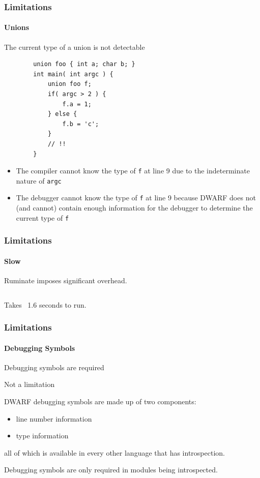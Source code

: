 \documentclass{beamer}
\begin{document}
\begin{frame}[fragile]
	\frametitle{Limitations}
	\framesubtitle{Unions}

	The current type of a union is not detectable

	\pause

	\begin{verbatim}
		union foo { int a; char b; }
		int main( int argc ) {
		    union foo f;
		    if( argc > 2 ) {
		        f.a = 1;
		    } else {
		        f.b = 'c';
		    }
		    // !!
		}
	\end{verbatim}

	\begin{itemize}
		\item The compiler cannot know the type of \lstinline|f| at line 9 due to the
			indeterminate nature of \lstinline|argc|
		\item The debugger cannot know the type of \lstinline|f| at line 9 because
			DWARF does not (and cannot) contain enough information for the debugger to
			determine the current type of \lstinline|f|
	\end{itemize}
\end{frame}

\begin{frame}
	\frametitle{Limitations}
	\framesubtitle{Slow}

	Ruminate imposes significant overhead.

	\inputminted[tabsize=4]{c}{ruminate_memory.c}

	Takes ~1.6 seconds to run.
\end{frame}

\begin{frame}
	\frametitle{Limitations}
	\framesubtitle{Debugging Symbols}

	Debugging symbols are required

	\pause

	Not a limitation

	\pause

	DWARF debugging symbols are made up of two components:
	\begin{itemize}
		\item line number information
		\item type information
	\end{itemize}
	all of which is available in every other language that has introspection.
	
	\pause

	Debugging symbols are only required in modules being introspected.
\end{frame}
\end{document}

